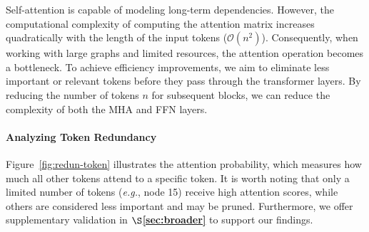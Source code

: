 \documentclass[letterpaper]{article} %
\begin{document}
Self-attention is capable of modeling long-term dependencies. However, the computational complexity of computing the attention matrix increases quadratically with the length of the input tokens ($\mathcal{O}(n^{2})$). Consequently, when working with large graphs and limited resources, the attention operation becomes a bottleneck. To achieve efficiency improvements, we aim to eliminate less important or relevant tokens before they pass through the transformer layers. By reducing the number of tokens $n$ for subsequent blocks, we can reduce the complexity of both the MHA and FFN layers.







\paragraph{Analyzing Token Redundancy} 

Figure~\ref{fig:redun-token} illustrates the attention probability, which measures how much all other tokens attend to a specific token. It is worth noting that only a limited number of tokens (\textit{e.g.}, node 15) receive high attention scores, while others are considered less important and may be pruned. Furthermore, we offer supplementary validation in \textbf{$\S$\ref{sec:broader}} to support our findings.
\end{document}
